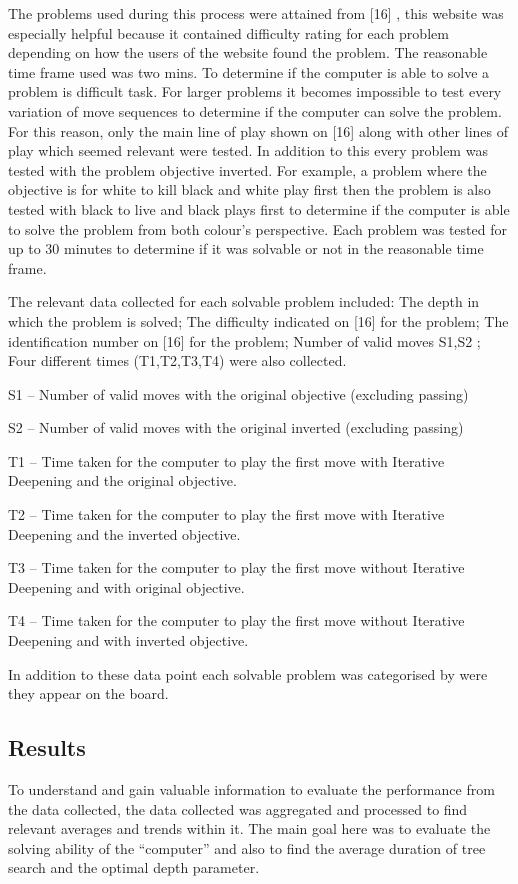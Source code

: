 \documentclass{l4proj}
\begin{document}
The problems used during this process were attained from [16] , this website was especially helpful because it contained difficulty rating for each problem depending on how the users of the website found the problem. The reasonable time frame used was two mins.
To determine if the computer is able to solve a problem is difficult task. For larger problems it becomes impossible to test every variation of move sequences to determine if the computer can solve the problem. For this reason, only the main line of play shown on [16] along with other lines of play which seemed relevant were tested. In addition to this every problem was tested with the problem objective inverted. For example, a problem where the objective is for white to kill black and white play first then the problem is also tested with black to live and black plays first to determine if the computer is able to solve the problem from both colour’s perspective. Each problem was tested for up to 30 minutes to determine if it was solvable or not in the reasonable time frame.

The relevant data collected for each solvable problem included: The depth in which the problem is solved; The difficulty indicated on [16] for the problem; The identification number on [16] for the problem; Number of valid moves S1,S2 ; Four different times (T1,T2,T3,T4) were also collected.

S1 – Number of valid moves with the original objective (excluding passing)

S2 – Number of valid moves with the original inverted (excluding passing)


T1 – Time taken for the computer to play the first move with Iterative Deepening and the original objective.

T2 – Time taken for the computer to play the first move with Iterative Deepening and the inverted objective.

T3 – Time taken for the computer to play the first move without Iterative Deepening and with original objective.

T4 – Time taken for the computer to play the first move without Iterative Deepening and with inverted objective.

In addition to these data point each solvable problem was categorised by were they appear on the board.

\subsection{Results}
To understand and gain valuable information to evaluate the performance from the data collected, the data collected was aggregated and processed to find relevant averages and trends within it. The main goal here was to evaluate the solving ability of the “computer” and also to find the average duration of tree search and the optimal depth parameter.
\end{document}
